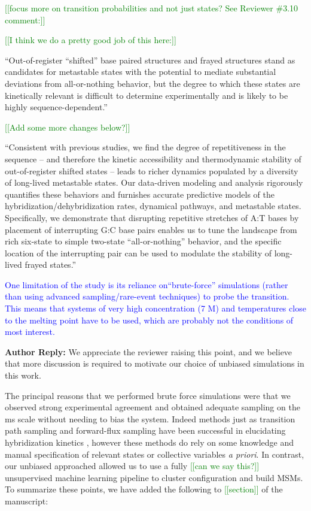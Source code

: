 \documentclass[11pt,a4paper]{letter} %
\newcommand*{\noteg}[1]{\textcolor{green}{[[#1]]}}		%
\begin{document}
\noteg{focus more on transition probabilities and not just states? See Reviewer \#3.10 comment:}

\noteg{I think we do a pretty good job of this here:}

``Out-of-register ``shifted'' base paired structures \citep{Flamm2000RNAResolution, Romano2013DNADependence, Hinckley2014Coarse-grainedEffects, Maciejczyk2014DNAModel, Araque2016LatticeCooperativity, Xiao2019} and frayed structures \citep{Zgarbova2014BaseRNA, Nonin1995TerminalFraying, Nikolova2012ProbingSimulations, Andreatta2006UltrafastHelix} stand as candidates for metastable states with the potential to mediate substantial deviations from all-or-nothing behavior, but the degree to which these states are kinetically relevant is difficult to determine experimentally and is likely to be highly sequence-dependent.''

\noteg{Add some more changes below?}

``Consistent with previous studies, \citep{Hinckley2014Coarse-grainedEffects,Romano2013DNADependence,Araque2016LatticeCooperativity} we find the degree of repetitiveness in the sequence -- and therefore the kinetic accessibility and thermodynamic stability of out-of-register shifted states -- leads to richer dynamics populated by a diversity of long-lived metastable states. Our data-driven modeling and analysis rigorously quantifies these behaviors and furnishes accurate predictive models of the hybridization/dehybridization rates, dynamical pathways, and metastable states. Specifically, we demonstrate that disrupting repetitive stretches of A:T bases by placement of interrupting G:C base pairs enables us to tune the landscape from rich six-state to simple two-state ``all-or-nothing'' behavior, and the specific location of the interrupting pair can be used to modulate the stability of long-lived frayed states.''

\textcolor{blue}{One limitation of the study is its reliance on``brute-force'' simulations (rather than using advanced sampling/rare-event techniques) to probe the transition. This means that systems of very high concentration (7 M) and temperatures close to the melting point have to be used, which are probably not the conditions of most interest.}

\textbf{Author Reply:}    We appreciate the reviewer raising this point, and we believe that more discussion is required to motivate our choice of unbiased simulations in this work. 

The principal reasons that we performed brute force simulations were that we observed strong experimental agreement and obtained adequate sampling on the ms scale without needing to bias the system.  Indeed methods just as transition path sampling and forward-flux sampling have been successful in elucidating hybridization kinetics \citep{Sambriski2009, Hinckley2014Coarse-grainedEffects, Jin2019}, however these methods do rely on some knowledge and manual specification of relevant states or collective variables \emph{a priori}. In contrast, our unbiased approached allowed us to use a fully \noteg{can we say this?} unsupervised machine learning pipeline to cluster configuration and build MSMs. To summarize these points, we have added the following to \noteg{section} of the manuscript:
\end{document}

